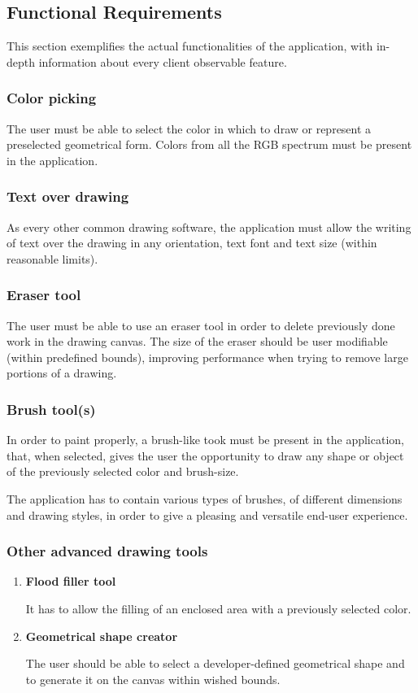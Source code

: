 \documentclass{article}
\begin{document}
\subsection{Functional Requirements}
This section exemplifies the actual functionalities of the application, with in-depth information about every client observable feature.
\subsubsection{Color picking}
The user must be able to select the color in which to draw or represent a preselected geometrical form. Colors from all the RGB spectrum must be present in the application.
\subsubsection{Text over drawing}
As every other common drawing software, the application must allow the writing of text over the drawing in any orientation, text font and text size (within reasonable limits).
\subsubsection{Eraser tool}
The user must be able to use an eraser tool in order to delete previously done work in the drawing canvas. The size of the eraser should be user modifiable (within predefined bounds), improving performance when trying to remove large portions of a drawing.
\subsubsection{Brush tool(s)}
In order to paint properly, a brush-like took must be present in the application, that, when selected, gives the user the opportunity to draw any shape or object of the previously selected color and brush-size.

The application has to contain various types of brushes, of different dimensions and drawing styles, in order to give a pleasing and versatile end-user experience.

\subsubsection{Other advanced drawing tools}
\begin{enumerate}

\item \textbf{Flood filler tool}

It has to allow the filling of an enclosed area with a previously selected color.

\item  \textbf{Geometrical shape creator}

The user should be able to select a developer-defined geometrical shape and to generate it on the canvas within wished bounds.

\end{enumerate}
\end{document}
